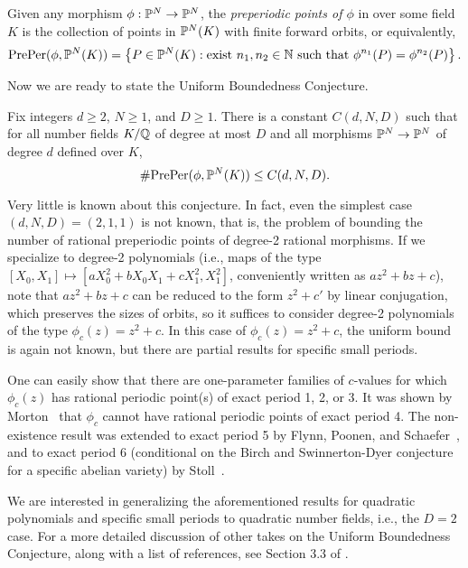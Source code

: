 \begin{definition}
  Given any morphism $\phi: \P^N \to \P^N$, the \emph{preperiodic
    points of $\phi$} in over some field $K$ is the collection of
  points in $\P^N(K)$ with finite forward orbits, or equivalently,
  \[
  \preper(\phi, \P^N(K)) = \set{P \in \P^N(K) : \text{exist $n_1, n_2
      \in \N$ such that $\phi^{n_1}(P) = \phi^{n_2}(P)$}}.
  \]
\end{definition}

Now we are ready to state the Uniform Boundedness Conjecture.

\begin{conjecture}
  Fix integers $d \ge 2$, $N \ge 1$, and $D \ge 1$. There is a
  constant $C(d, N, D)$ such that for all number fields $K/\Q$ of
  degree at most $D$ and all morphisms $\P^N \to \P^N$ of degree $d$
  defined over $K$,
  \[
  \#\preper(\phi, \P^N(K)) \le C(d, N, D).
  \]
\end{conjecture}

Very little is known about this conjecture. In fact, even the simplest
case $(d, N, D) = (2, 1, 1)$ is not known, that is, the problem of
bounding the number of rational preperiodic points of degree-2
rational morphisms. If we specialize to degree-2 polynomials (i.e.,
maps of the type $[X_0, X_1] \mapsto [a X_0^2 + b X_0 X_1 + c X_1^2,
X_1^2]$, conveniently written as $a z^2 + b z + c$), note that $a z^2
+ b z + c$ can be reduced to the form $z^2 + c'$ by linear
conjugation, which preserves the sizes of orbits, so it suffices to
consider degree-2 polynomials of the type $\phi_c(z) = z^2 + c$. In
this case of $\phi_c(z) = z^2 + c$, the uniform bound is again not
known, but there are partial results for specific small periods.

One can easily show that there are one-parameter families of
$c$-values for which $\phi_c(z)$ has rational periodic point(s) of
exact period 1, 2, or 3. It was shown by Morton~\cite{MR1665198} that
$\phi_c$ cannot have rational periodic points of exact period 4. The
non-existence result was extended to exact period 5 by Flynn, Poonen,
and Schaefer~\cite{MR1480542}, and to exact period 6 (conditional on
the Birch and Swinnerton-Dyer conjecture for a specific abelian
variety) by Stoll~\cite{MR2465796}.

We are interested in generalizing the aforementioned results for
quadratic polynomials and specific small periods to quadratic number
fields, i.e., the $D = 2$ case. For a more detailed discussion of
other takes on the Uniform Boundedness Conjecture, along with a list
of references, see Section 3.3 of \cite{MR2316407}.

